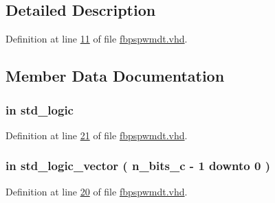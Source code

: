 \subsection{Detailed Description}


Definition at line \hyperlink{fbpspwmdt_8vhd_source_l00011}{11} of file \hyperlink{fbpspwmdt_8vhd_source}{fbpspwmdt.\+vhd}.



\subsection{Member Data Documentation}
\hypertarget{classfbpspwmdt_af9b8278b961604ab62a822537a109adb}{}
\subsubsection[{amost}]{ {\bfseries \textcolor{keywordflow}{in}\textcolor{vhdlchar}{ }} {\bfseries \textcolor{comment}{std\+\_\+logic}\textcolor{vhdlchar}{ }} \hspace{0.3cm}{\ttfamily [Port]}}\label{classfbpspwmdt_af9b8278b961604ab62a822537a109adb}


Definition at line \hyperlink{fbpspwmdt_8vhd_source_l00021}{21} of file \hyperlink{fbpspwmdt_8vhd_source}{fbpspwmdt.\+vhd}.

\hypertarget{classfbpspwmdt_a0808bf3e7965a8ee90dec6604647f179}{}
\subsubsection[{c}]{ {\bfseries \textcolor{keywordflow}{in}\textcolor{vhdlchar}{ }} {\bfseries \textcolor{comment}{std\+\_\+logic\+\_\+vector}\textcolor{vhdlchar}{ }\textcolor{vhdlchar}{(}\textcolor{vhdlchar}{ }\textcolor{vhdlchar}{ }\textcolor{vhdlchar}{ }\textcolor{vhdlchar}{ }{\bfseries {\bf n\+\_\+bits\+\_\+c}} \textcolor{vhdlchar}{-\/}\textcolor{vhdlchar}{ } \textcolor{vhdldigit}{1} \textcolor{vhdlchar}{ }\textcolor{keywordflow}{downto}\textcolor{vhdlchar}{ }\textcolor{vhdlchar}{ } \textcolor{vhdldigit}{0} \textcolor{vhdlchar}{ }\textcolor{vhdlchar}{)}\textcolor{vhdlchar}{ }} \hspace{0.3cm}{\ttfamily [Port]}}\label{classfbpspwmdt_a0808bf3e7965a8ee90dec6604647f179}


Definition at line \hyperlink{fbpspwmdt_8vhd_source_l00020}{20} of file \hyperlink{fbpspwmdt_8vhd_source}{fbpspwmdt.\+vhd}.

